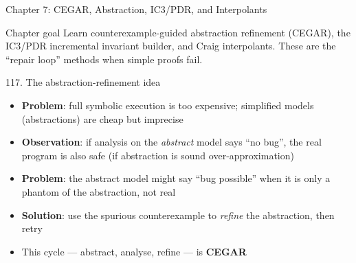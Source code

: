 \documentclass[aspectratio=169]{beamer}
\begin{document}

\begin{frame}{Chapter 7: CEGAR, Abstraction, IC3/PDR, and Interpolants}
\begin{block}{Chapter goal}
Learn counterexample-guided abstraction refinement (CEGAR), the IC3/PDR incremental invariant
builder, and Craig interpolants. These are the ``repair loop'' methods when simple proofs fail.
\end{block}
\end{frame}

\begin{frame}{117. The abstraction-refinement idea}
\begin{itemize}
  \item \textbf{Problem}: full symbolic execution is too expensive; simplified models (abstractions) are cheap but imprecise
  \item \textbf{Observation}: if analysis on the \emph{abstract} model says ``no bug'', the real program is also safe (if abstraction is sound over-approximation)
  \item \textbf{Problem}: the abstract model might say ``bug possible'' when it is only a phantom of the abstraction, not real
  \item \textbf{Solution}: use the spurious counterexample to \emph{refine} the abstraction, then retry
  \item This cycle --- abstract, analyse, refine --- is \textbf{CEGAR}
\end{itemize}
\end{frame}
\end{document}
